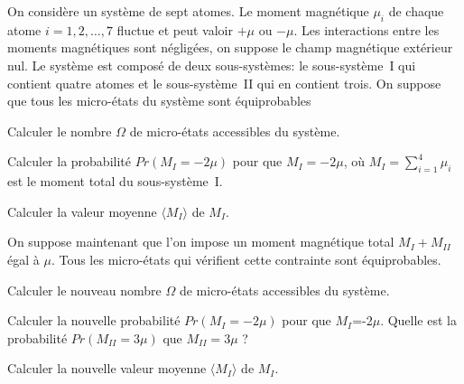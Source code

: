 On considère un système de sept atomes. Le moment magnétique $\mu_i$ de chaque atome $i=1,2,\dots, 7$ fluctue et peut valoir $+\mu$ ou $-\mu$. Les interactions entre les moments magnétiques sont négligées, on suppose le champ magnétique extérieur nul. Le système est composé de deux sous-systèmes: le sous-système~I qui contient quatre atomes et le sous-système~II qui en contient trois. On suppose que tous les micro-états du système sont équiprobables

\question
Calculer le nombre $\varOmega$ de micro-états accessibles du système.
  
\question
Calculer la probabilité $Pr(M_I=-2\mu)$ pour que $M_I=-2\mu$, où $\displaystyle M_I=\sum_{i=1}^4 \mu_i$ est le moment total du sous-système~I. 

\question
Calculer la valeur moyenne $\langle M_I \rangle$ de $M_I$. 

\medskip

On suppose maintenant que l'on impose un moment magnétique total
$M_I+M_{II}$ égal à $\mu$. Tous les micro-états qui vérifient cette
contrainte sont équiprobables.

\question
Calculer le nouveau nombre $\varOmega$ de micro-états accessibles du système. 

\question
Calculer la nouvelle probabilité $Pr(M_I=-2\mu)$  pour que $M_I$=-2$\mu$. Quelle est la probabilité $Pr(M_{II}=3\mu)$ que $M_{II}=3\mu$ ? 

\question
Calculer la nouvelle valeur moyenne $\langle M_I \rangle$ de $M_I$. 
